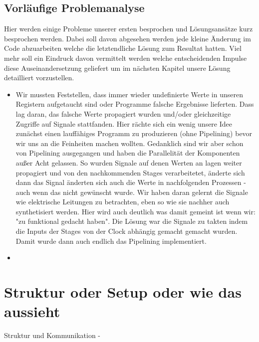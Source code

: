 \documentclass[paper=a4,fontsize=12pt,twocolumn]{scrreprt}
\begin{document}
\subsection{Vorläufige Problemanalyse}

Hier werden einige Probleme unserer ersten besprochen und Lösungsansätze kurz besprochen werden. Dabei soll davon abgesehen werden jede kleine Änderung im Code abzuarbeiten welche die letztendliche Lösung zum Resultat hatten. Viel mehr soll ein Eindruck davon vermittelt werden welche entscheidenden Impulse diese Auseinandersetzung geliefert um im nächsten Kapitel unsere Lösung detailliert vorzustellen.

\begin{itemize}
    \item Wir mussten Feststellen, dass immer wieder undefinierte Werte in unseren Registern aufgetaucht sind oder Programme falsche Ergebnisse lieferten.
    Dass lag daran, das falsche Werte propagiert wurden und/oder gleichzeitige Zugriffe auf Signale stattfanden.
    Hier rächte sich ein wenig unsere Idee zunächst einen lauffähiges Programm zu produzieren (ohne Pipelining) bevor wir uns an die Feinheiten machen wollten.
    Gedanklich sind wir aber schon von Pipelining ausgegangen und haben die Parallelität der Komponenten außer Acht gelassen.
    So wurden Signale auf denen Werten an lagen weiter propagiert und von den nachkommenden Stages verarbeitetet, änderte sich dann das Signal änderten sich auch die Werte in nachfolgenden Prozessen - auch wenn das nicht gewünscht wurde.
    Wir haben daran gelernt die Signale wie elektrische Leitungen zu betrachten, eben so wie sie nachher auch synthetisiert werden.
    Hier wird auch deutlich was damit gemeint ist wenn wir: "zu funktional gedacht haben".
    Die Lösung war die Signale zu takten indem die Inputs der Stages von der Clock abhängig gemacht gemacht wurden. Damit wurde dann auch endlich das Pipelining implementiert.
    \item 
\end{itemize}


\section{Struktur oder Setup oder wie das aussieht}
Struktur und Kommunikation -
\end{document}
